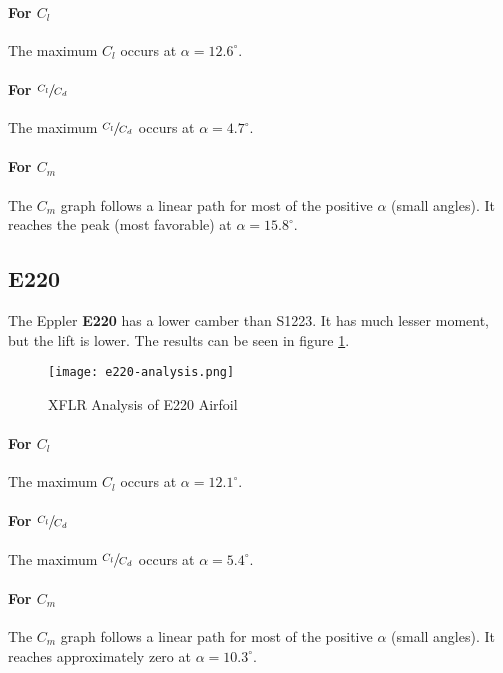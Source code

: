 \paragraph{For $C_l$}
The maximum $C_l$ occurs at $\alpha=12.6^\circ$.

\paragraph{For $\sfrac{C_l}{C_d}$}
The maximum $\sfrac{C_l}{C_d}$ occurs at $\alpha = 4.7^\circ$.

\paragraph{For $C_m$}
The $C_m$ graph follows a linear path for most of the positive $\alpha$ (small angles). It reaches the peak (most favorable) at $\alpha = 15.8^\circ$.

\subsection{E220}

The Eppler \textbf{E220} has a lower camber than S1223. It has much lesser moment, but the lift is lower. The results can be seen in figure \ref{fig:e220-analysis}.

\begin{figure}[ht]
    \centering
    \texttt{[image: e220-analysis.png]}
    \caption{XFLR Analysis of E220 Airfoil}
    \label{fig:e220-analysis}
\end{figure}

\paragraph{For $C_l$}
The maximum $C_l$ occurs at $\alpha=12.1^\circ$.

\paragraph{For $\sfrac{C_l}{C_d}$}
The maximum $\sfrac{C_l}{C_d}$ occurs at $\alpha = 5.4^\circ$.

\paragraph{For $C_m$}
The $C_m$ graph follows a linear path for most of the positive $\alpha$ (small angles). It reaches approximately zero at $\alpha = 10.3^\circ$.

